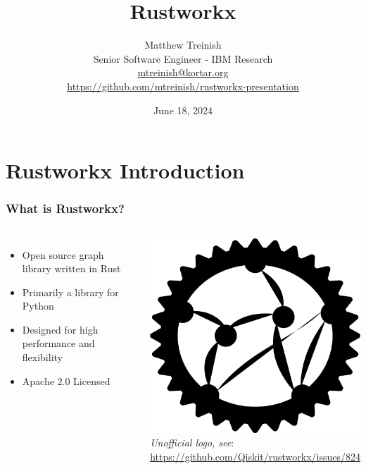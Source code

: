 \documentclass[aspectratio=169,11pt,hyperref={colorlinks=true}]{beamer}
\author[Matthew Treinish]{%
    \texorpdfstring{%
        \centering
        Matthew Treinish\\
        Senior Software Engineer - IBM Research\\
        \href{mailto:mtreinish@kortar.org}{mtreinish@kortar.org}\\
        \href{https://github.com/mtreinish/rustworkx-presentation}{https://github.com/mtreinish/rustworkx-presentation}
   }
   {Matthew Treinish}
}
\date{June 18, 2024}
\title{Rustworkx}
\begin{document}
\titlepage
\section{Rustworkx Introduction}
\begin{frame}
    \frametitle{What is Rustworkx?}
    \begin{columns}
            \begin{itemize}
                \item Open source graph library written in Rust
                \item Primarily a library for Python
                \item Designed for high performance and flexibility
                \item Apache 2.0 Licensed
            \end{itemize}
            \centering
            \includegraphics[width=.8\textwidth]{rustworkx_logo.png}\\
            \footnotesize
            \textit{Unofficial logo, see}:\\ \href{https://github.com/Qiskit/rustworkx/issues/824}{https://github.com/Qiskit/rustworkx/issues/824}
    \end{columns}
\end{frame}
\end{document}
